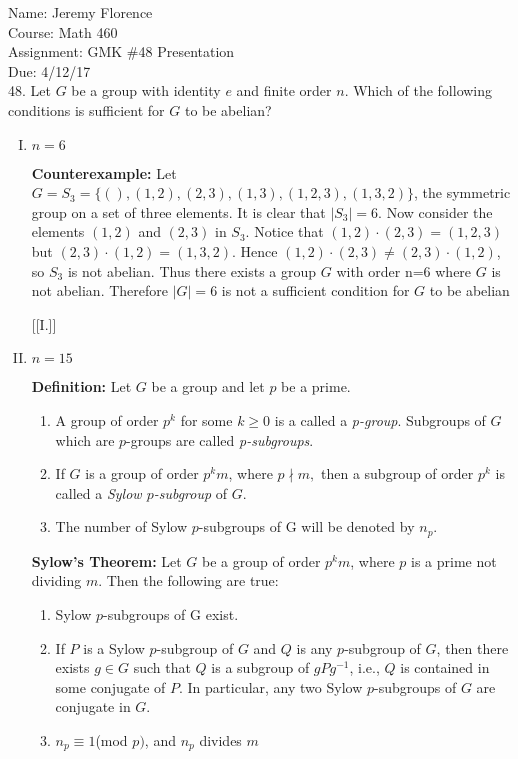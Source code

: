 \documentclass{article}
\begin{document}
Name: Jeremy Florence\\
Course: Math 460\\
Assignment: GMK \#48 Presentation\\
Due: 4/12/17\\

48.	Let $G$ be a group with identity $e$ and finite order $n$. Which of the following conditions is sufficient for $G$ to be abelian?

\begin{enumerate}[I.]
\item $n=6$

\textbf{Counterexample:} Let $G=S_3=\{(),(1,2),(2,3),(1,3),(1,2,3),(1,3,2)\}$, the symmetric group on a set of three elements. It is clear that $|S_3|=6$. Now consider the elements $(1,2)$ and $(2,3)$ in $S_3$. Notice that $(1,2) \cdot (2,3)=(1,2,3)$ but $(2,3) \cdot (1,2)=(1,3,2).$ Hence $(1,2) \cdot (2,3) \neq (2,3) \cdot (1,2)$, so $S_3$ is not abelian. Thus there exists a group $G$ with order n=6 where $G$ is not abelian. Therefore $|G|=6$ is not a sufficient condition for $G$ to be abelian

[{[I.]}]
\item $n=15$

\textbf{Definition:} Let $G$ be a group and let $p$ be a prime. 
\begin{enumerate}[(1)]
\item A group of order $p^k$ for some $k \geq 0$ is a called a \emph{p-group}. Subgroups of $G$ which are $p$-groups are called \emph{p-subgroups}.
\item If $G$ is a group of order $p^km$, where $p\nmid m,$ then a subgroup of order $p^k$ is called a \emph{Sylow $p$-subgroup} of $G$.
\item The number of Sylow $p$-subgroups of G will be denoted by $n_p$.
\end{enumerate}

\textbf{Sylow's Theorem:} Let $G$ be a group of order $p^km$, where $p$ is a prime not dividing $m$. Then the following are true:
\begin{enumerate}[(1)]
\item Sylow $p$-subgroups of G exist.
\item If $P$ is a Sylow $p$-subgroup of $G$ and $Q$ is any $p$-subgroup of $G$, then there exists $g \in G$ such that $Q$ is a subgroup of $gPg^{-1}$, i.e., $Q$ is contained in some conjugate of $P$. In particular, any two Sylow $p$-subgroups of $G$ are conjugate in $G$.
\item $n_p \equiv 1 $(mod $ p)$, and $n_p$ divides $m$
\end{enumerate}


\end{enumerate}
\end{document}

